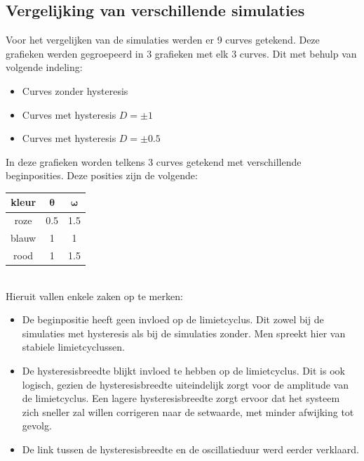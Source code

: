 \documentclass[12pt]{article}
\begin{document}
\subsection{Vergelijking van verschillende simulaties}
Voor het vergelijken van de simulaties werden er 9 curves getekend. Deze grafieken werden gegroepeerd in 3 grafieken met elk 3 curves. Dit met behulp van volgende indeling:
\begin{itemize}
	\item Curves zonder hysteresis
	\item Curves met hysteresis $D = \pm 1$
	\item Curves met hysteresis $D = \pm 0.5$
\end{itemize}
In deze grafieken worden telkens 3 curves getekend met verschillende beginposities. Deze posities zijn de volgende:
\begin{table}[!h]
\centering
	\begin{tabular}{|c|c|c|}
		\hline
		\textbf{kleur} & $\bm{\theta}$ & $\bm{\omega}$ \\
		\hline
		roze & 0.5 & 1.5 \\
		blauw & 1 & 1 \\
		rood & 1 & 1.5 \\
		\hline
	\end{tabular}
\end{table} \\
Hieruit vallen enkele zaken op te merken:
\begin{itemize}
	\item De beginpositie heeft geen invloed op de limietcyclus. Dit zowel bij de simulaties met hysteresis als bij de simulaties zonder. Men spreekt hier van stabiele limietcyclussen.
	\item De hysteresisbreedte blijkt invloed te hebben op de limietcyclus. Dit is ook logisch, gezien de hysteresisbreedte uiteindelijk zorgt voor de amplitude van de limietcyclus. Een lagere hysteresisbreedte zorgt ervoor dat het systeem zich sneller zal willen corrigeren naar de setwaarde, met minder afwijking tot gevolg.
	\item De link tussen de hysteresisbreedte en de oscillatieduur werd eerder verklaard.
\end{itemize}
\clearpage
\end{document}
